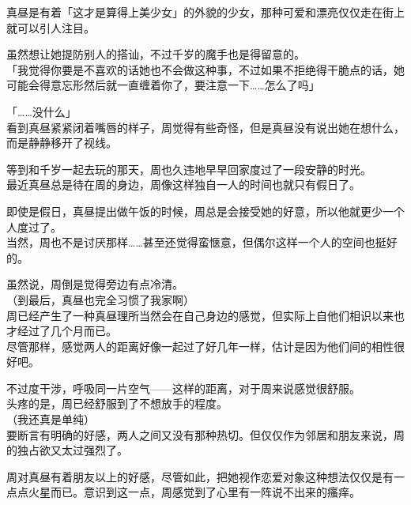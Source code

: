 真昼是有着「这才是算得上美少女」的外貌的少女，那种可爱和漂亮仅仅走在街上就可以引人注目。

虽然想让她提防别人的搭讪，不过千岁的魔手也是得留意的。\\

「我觉得你要是不喜欢的话她也不会做这种事，不过如果不拒绝得干脆点的话，她可能会得意忘形然后就一直缠着你了，要注意一下……怎么了吗」

「……没什么」\\

看到真昼紧紧闭着嘴唇的样子，周觉得有些奇怪，但是真昼没有说出她在想什么，而是静静移开了视线。\\

\vspace{2\baselineskip}

等到和千岁一起去玩的那天，周也久违地早早回家度过了一段安静的时光。\\

最近真昼总是待在周的身边，周像这样独自一人的时间也就只有假日了。

即使是假日，真昼提出做午饭的时候，周总是会接受她的好意，所以他就更少一个人度过了。\\

当然，周也不是讨厌那样……甚至还觉得蛮惬意，但偶尔这样一个人的空间也挺好的。

虽然说，周倒是觉得旁边有点冷清。\\

（到最后，真昼也完全习惯了我家啊）\\

周已经产生了一种真昼理所当然会在自己身边的感觉，但实际上自他们相识以来也才经过了几个月而已。\\

尽管那样，感觉两人的距离好像一起过了好几年一样，估计是因为他们间的相性很好吧。

不过度干涉，呼吸同一片空气——这样的距离，对于周来说感觉很舒服。\\

头疼的是，周已经舒服到了不想放手的程度。\\

（我还真是单纯）\\

要断言有明确的好感，两人之间又没有那种热切。但仅仅作为邻居和朋友来说，周的独占欲又太过强烈了。

周对真昼有着朋友以上的好感，尽管如此，把她视作恋爱对象这种想法仅仅是有一点点火星而已。意识到这一点，周感觉到了心里有一阵说不出来的瘙痒。\\

